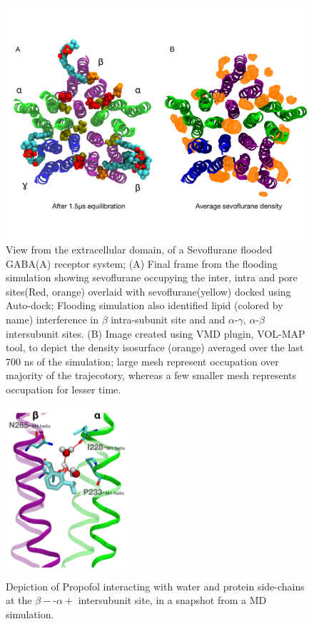 \documentclass[12pt]{article}
\begin{document}
\begin{figure}
\begin{center}
\centering
\includegraphics[width = 1\textwidth]{finlpics/Figure_8}
\caption{View from the extracellular domain, of a Sevoflurane flooded GABA(A) receptor system; (A) Final frame from the flooding simulation  showing sevoflurane occupying the inter, intra and pore sites(Red, orange) overlaid with sevoflurane(yellow) docked using Auto-dock; Flooding simulation also identified lipid (colored by name) interference in $\beta$ intra-subunit site and and $\alpha$-$\gamma$, $\alpha$-$\beta$ intersubunit sites. (B) Image created using VMD plugin, VOL-MAP tool, to depict the density isosurface (orange)  averaged over the last 700 ns of the simulation; large mesh represent occupation over majority of the trajecotory, whereas a few smaller mesh represents occupation for lesser time.}
\label{fig:sevVolMap}
\end{center}
\end{figure}

\begin{figure}
\begin{center}
\centering
\includegraphics[width = 0.4\textwidth]{finlpics/Figure_9}
\caption{Depiction of Propofol interacting with water and protein side-chains at the $\beta-$-$\alpha+$ intersubunit site, in a snapshot from a MD simulation.}
\label{fig:PFLhbond}
\end{center}
\end{figure}
\end{document}
